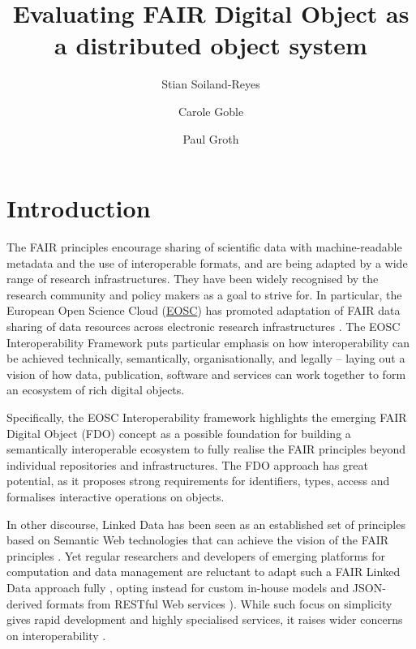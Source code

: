 \documentclass[fleqn,10pt,lineno]{wlpeerjlua}
\title{Evaluating FAIR Digital Object as a distributed object system}
\author[1,2]{Stian Soiland-Reyes} %
\author[1]{Carole Goble}          %
\author[2]{Paul Groth}            %
\affil[1]{Department of Computer Science, The University of Manchester, UK}
\affil[2]{Informatics Institute, Faculty of Science, University of Amsterdam, NL }
\begin{document}
\flushbottom
\maketitle
\thispagestyle{empty}

\hypertarget{sec:introduction}{%
\section*{Introduction}\label{sec:introduction}}

The FAIR principles \autocite{wilkinsonFAIRGuidingPrinciples2016e} encourage sharing of scientific data with machine-readable metadata and the use of interoperable formats, and are being adapted by a wide range of research infrastructures. They have been widely recognised by the research community and policy makers as a goal to strive for. In particular, the European Open Science Cloud (\href{https://www.eosc.eu/}{EOSC}) has promoted adaptation of FAIR data sharing of data resources across electronic research infrastructures \autocite{monsCloudyIncreasinglyFAIR2017b}. The EOSC Interoperability Framework \autocite{corchoEOSCInteroperabilityFramework2021b} puts particular emphasis on how interoperability can be achieved technically, semantically, organisationally, and legally -- laying out a vision of how data, publication, software and services can work together to form an ecosystem of rich digital objects.

Specifically, the EOSC Interoperability framework highlights the emerging FAIR Digital Object \autocite{schultesFAIRPrinciplesDigital2019a} (FDO) concept as a possible foundation for building a semantically interoperable ecosystem to fully realise the FAIR principles beyond individual repositories and infrastructures. The FDO approach has great potential, as it proposes strong requirements for identifiers, types, access and formalises interactive operations on objects.

In other discourse, Linked Data \autocite{bizerLinkedDataStory2009a} has been seen as an established set of principles based on Semantic Web technologies that can achieve the vision of the FAIR principles \autocite{boninodasilvasantosFAIRDataPoints2016a,hasnainAssessingFAIRData2018a}. Yet regular researchers and developers of emerging platforms for computation and data management are reluctant to adapt such a FAIR Linked Data approach fully \autocite{verborghSemanticWebIdentity2020a}, opting instead for custom in-house models and JSON-derived formats from RESTful Web services \autocite{merono-penuelaConclusionFutureChallenges2021a,neumannAnalysisPublicREST2021a}). While such focus on simplicity gives rapid development and highly specialised services, it raises wider concerns on interoperability \autocite{turcoaneLinkedDataJSONLD2014a,wilkinsonWorkflowsWhenParts2022b}.
\end{document}

